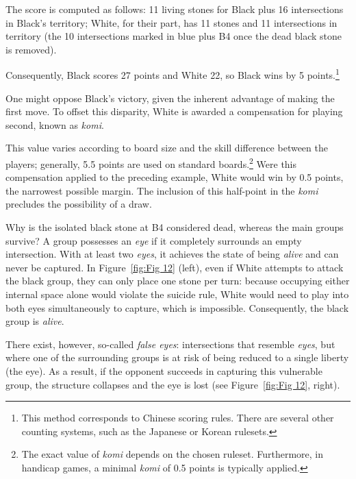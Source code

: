 The score is computed as follows: 11 living stones for Black plus 16 intersections in Black's territory; White, for their part, has 11 stones and 11 intersections in territory (the 10 intersections marked in blue plus B4 once the dead black stone is removed).

Consequently, Black scores 27 points and White 22,
so Black wins by 5 points.\footnote{This method corresponds to Chinese scoring rules. There are several other counting systems, such as the Japanese or Korean rulesets.}

One might oppose Black's victory, given the inherent advantage of making the first move. To offset this disparity, White is awarded a compensation for playing second, known as \textit{komi}.

This value varies according to board size and the skill difference between the players; generally, 5.5 points are
used on standard boards.\footnote{The exact value of \textit{komi} depends on the chosen ruleset. Furthermore, in handicap games, a minimal \textit{komi} of 0.5 points is typically applied.} Were this compensation applied to the preceding example, White would win by 0.5 points, the narrowest possible margin. The inclusion of this half-point in the \textit{komi} precludes the possibility
of a draw.

Why is the isolated black stone at B4 considered dead, whereas the main groups survive? A group possesses an \textit{eye} if it completely surrounds an empty
intersection. With at least two \textit{eyes}, it achieves the state of being \textit{alive} and can never be captured. In Figure~\ref{fig:Fig 12} (left), even if White attempts to attack the black group, they can only place one stone per turn: because occupying either internal space alone would violate the suicide rule, White would need to play into both eyes simultaneously to capture, which is impossible. Consequently, the black group is \textit{alive}.

There exist, however, so-called \textit{false eyes}: intersections that resemble \textit{eyes}, but where one of the surrounding groups is at risk of being reduced to a single liberty (the eye). As a result, if the opponent succeeds in capturing this vulnerable group, the structure collapses and the eye is lost (see Figure~\ref{fig:Fig 12}, right).


